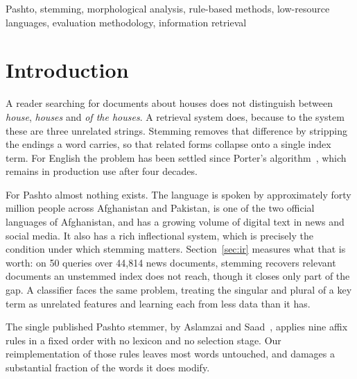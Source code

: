 \documentclass[conference]{IEEEtran}
\begin{document}
\begin{abstract}
A secondary finding concerns evaluation itself. The protocol used in the prior
work, presenting system output to native speakers and asking whether it is
acceptable, assigns a score of 100\% to a system that modifies no word at
all. We report results under both that protocol and exact match against a
reference fixed in advance, and recommend the latter for Pashto stemming.
\end{abstract}

\begin{IEEEkeywords}
Pashto, stemming, morphological analysis, rule-based methods, low-resource
languages, evaluation methodology, information retrieval
\end{IEEEkeywords}

\section{Introduction}

A reader searching for documents about houses does not distinguish between
\emph{house}, \emph{houses} and \emph{of the houses}. A retrieval system does,
because to the system these are three unrelated strings. Stemming removes that
difference by stripping the endings a word carries, so that related forms
collapse onto a single index term. For English the problem has been settled
since Porter's algorithm~\cite{porter1980}, which remains in production use
after four decades.

For Pashto almost nothing exists. The language is spoken by approximately
forty million people across Afghanistan and Pakistan, is one of the two
official languages of Afghanistan, and has a growing volume of digital text in
news and social media. It also has a rich inflectional system, which is
precisely the condition under which stemming matters. Section~\ref{sec:ir}
measures what that is worth: on 50 queries over 44{,}814 news documents, stemming
recovers relevant documents an unstemmed index does not reach, though it closes
only part of the gap. A classifier faces the same problem, treating the singular
and plural of a key term as unrelated features and learning each from less data
than it has.

The single published Pashto stemmer, by Aslamzai and Saad~\cite{aslamzai2015},
applies nine affix rules in a fixed order with no lexicon and no selection
stage. Our reimplementation of those rules leaves most words untouched, and
damages a substantial fraction of the words it does modify.
\end{document}
